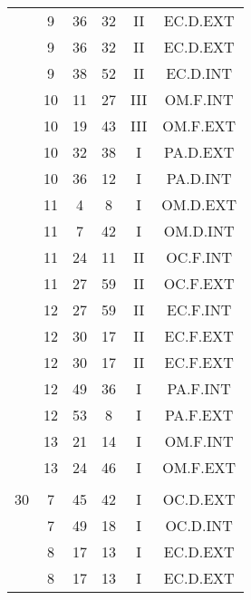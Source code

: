 \documentclass[12pt, a4paper]{article}
\begin{document}
\begin{multicols}{3}
{\begin{tabular}{c c c c c c}
	 	 	 	 & 9 & 36 & 32 & II & EC.D.EXT\\%
	 	 	 	 & 9 & 36 & 32 & II & EC.D.EXT\\%
	 	 	 	 & 9 & 38 & 52 & II & EC.D.INT\\%
	 	 	 	 & 10 & 11 & 27 & III & OM.F.INT\\%
	 	 	 	 & 10 & 19 & 43 & III & OM.F.EXT\\%
	 	 	 	 & 10 & 32 & 38 & I & PA.D.EXT\\%
	 	 	 	 & 10 & 36 & 12 & I & PA.D.INT\\%
	 	 	 	 & 11 & 4 & 8 & I & OM.D.EXT\\%
	 	 	 	 & 11 & 7 & 42 & I & OM.D.INT\\%
	 	 	 	 & 11 & 24 & 11 & II & OC.F.INT\\%
	 	 	 	 & 11 & 27 & 59 & II & OC.F.EXT\\%
	 	 	 	 & 12 & 27 & 59 & II & EC.F.INT\\%
	 	 	 	 & 12 & 30 & 17 & II & EC.F.EXT\\%
	 	 	 	 & 12 & 30 & 17 & II & EC.F.EXT\\%
	 	 	 	 & 12 & 49 & 36 & I & PA.F.INT\\%
	 	 	 	 & 12 & 53 & 8 & I & PA.F.EXT\\%
	 	 	 	 & 13 & 21 & 14 & I & OM.F.INT\\%
	 	 	 	 & 13 & 24 & 46 & I & OM.F.EXT\\%
	 	 	 	 & & & & & \\%
	 	 	 	30 & 7 & 45 & 42 & I & OC.D.EXT\\%
	 	 	 	 & 7 & 49 & 18 & I & OC.D.INT\\%
	 	 	 	 & 8 & 17 & 13 & I & EC.D.EXT\\%
	 	 	 	 & 8 & 17 & 13 & I & EC.D.EXT\\%

\end{tabular}}
\end{multicols}
\end{document}
